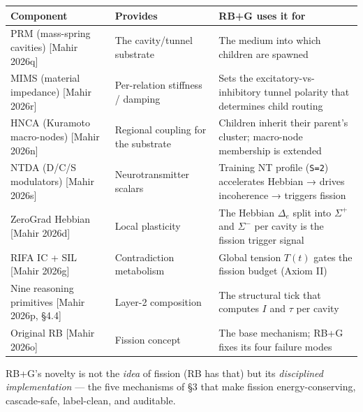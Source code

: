 \documentclass[
  11pt,
  a4paper,
]{article}
\begin{document}
\begin{longtable}[]{@{}
  >{\raggedright\arraybackslash}p{}
  >{\raggedright\arraybackslash}p{}
  >{\raggedright\arraybackslash}p{}@{}}
\toprule\noalign{}
\begin{minipage}[b]{\linewidth}\raggedright
Component
\end{minipage} & \begin{minipage}[b]{\linewidth}\raggedright
Provides
\end{minipage} & \begin{minipage}[b]{\linewidth}\raggedright
RB+G uses it for
\end{minipage} \\
\midrule\noalign{}
\endhead
\bottomrule\noalign{}
\endlastfoot
PRM (mass-spring cavities) {[}Mahir 2026q{]} & The cavity/tunnel
substrate & The medium into which children are spawned \\
MIMS (material impedance) {[}Mahir 2026r{]} & Per-relation stiffness /
damping & Sets the excitatory-vs-inhibitory tunnel polarity that
determines child routing \\
HNCA (Kuramoto macro-nodes) {[}Mahir 2026n{]} & Regional coupling for
the substrate & Children inherit their parent's cluster; macro-node
membership is extended \\
NTDA (D/C/S modulators) {[}Mahir 2026s{]} & Neurotransmitter scalars &
Training NT profile (\texttt{S=2}) accelerates Hebbian → drives
incoherence → triggers fission \\
ZeroGrad Hebbian {[}Mahir 2026d{]} & Local plasticity & The Hebbian
\(\Delta_e\) split into \(\Sigma^+\) and \(\Sigma^-\) per cavity is the
fission trigger signal \\
RIFA IC + SIL {[}Mahir 2026g{]} & Contradiction metabolism & Global
tension \(T(t)\) gates the fission budget (Axiom II) \\
Nine reasoning primitives {[}Mahir 2026p, §4.4{]} & Layer-2 composition
& The structural tick that computes \(I\) and \(\tau\) per cavity \\
Original RB {[}Mahir 2026o{]} & Fission concept & The base mechanism;
RB+G fixes its four failure modes \\
\end{longtable}

RB+G's novelty is not the \emph{idea} of fission (RB has that) but its
\emph{disciplined implementation} --- the five mechanisms of §3 that
make fission energy-conserving, cascade-safe, label-clean, and
auditable.
\end{document}
